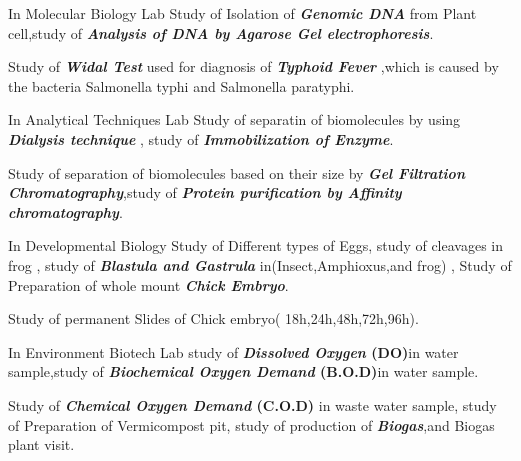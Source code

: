 \documentclass[]{dhirendra-pratap-singh-resume}
\begin{document}
\begin{minipage}[t]{0.66\textwidth}
\begin{tightemize}
\item In Molecular Biology Lab Study of Isolation of\textbf{\textit{ Genomic DNA }}from Plant cell,study of\textbf{\textit{ Analysis of DNA by Agarose Gel electrophoresis}}. 
\item Study of\textbf{\textit{ Widal Test}} used for diagnosis of\textbf{\textit{ Typhoid Fever}} ,which is caused by the bacteria Salmonella typhi and Salmonella paratyphi.
\item \textbf{} In Analytical Techniques Lab Study of separatin of biomolecules by using\textbf{\textit{ Dialysis technique}} , study of \textbf{\textit{Immobilization of Enzyme}}.
\item Study of separation of biomolecules based on their size by \textbf{\textit{  Gel Filtration Chromatography}},study of \textbf{\textit {Protein purification by Affinity chromatography}}.
\end{tightemize}

\begin{tightemize}
\item In Developmental Biology Study of Different types of Eggs, study of cleavages in frog , study of\textbf{ \textit{  Blastula and Gastrula }}in(Insect,Amphioxus,and frog) 
% 
, Study of Preparation of whole mount\textbf{\textit{ Chick Embryo}}. \textbf{} 
\item Study of permanent Slides of Chick embryo( 18h,24h,48h,72h,96h).
\end{tightemize}

\begin{tightemize}
\item In Environment Biotech Lab study of\textbf{\textit{ Dissolved Oxygen} (DO)}in water sample,study of \textbf{\textit{Biochemical Oxygen Demand} (B.O.D)}in water sample.
\item Study of \textbf{\textit{Chemical Oxygen Demand} (C.O.D)} in waste water sample, study of Preparation of Vermicompost pit, study of production of \textbf{\textit{Biogas}},and Biogas plant visit.
\end{tightemize}


\end{minipage}
\end{document}
